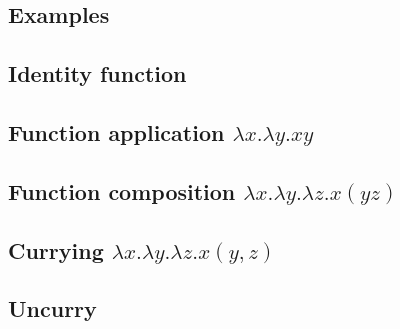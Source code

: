 \documentclass[varwidth]{article}
\theoremstyle{definition}
\newcommand{\fst}{\mathrm{fst}}
\newcommand{\snd}{\mathrm{snd}}
\begin{document}
\newpage
\begin{appendices}
	
	
    \begin{landscape}
    	\section{Examples}
        \subsection{Identity function}
             \label{ex1}
        \subsection{Function application $\lambda x . \lambda y . x y$}
             \label{ex2}
        \subsection{Function composition $\lambda x . \lambda y . \lambda z . x ( y z)$} %
             \label{ex7}
        
        
        \subsection{Currying $\lambda x . \lambda y . \lambda z . x (y, z)$} %
             \label{ex8}
        \subsection{Uncurry}
             \label{ex9}
        
        
        
    \end{landscape}
	
\end{appendices}


 

\end{document}
